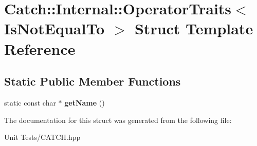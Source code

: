 \hypertarget{structCatch_1_1Internal_1_1OperatorTraits_3_01IsNotEqualTo_01_4}{}\section{Catch\+:\+:Internal\+:\+:Operator\+Traits$<$ Is\+Not\+Equal\+To $>$ Struct Template Reference}
\label{structCatch_1_1Internal_1_1OperatorTraits_3_01IsNotEqualTo_01_4}
\subsection*{Static Public Member Functions}
\begin{DoxyCompactItemize}
\item 
static const char $\ast$ {\bfseries get\+Name} ()\hypertarget{structCatch_1_1Internal_1_1OperatorTraits_3_01IsNotEqualTo_01_4_a54a795b8bf7c80a9fdbc7b81f39133b4}{}\label{structCatch_1_1Internal_1_1OperatorTraits_3_01IsNotEqualTo_01_4_a54a795b8bf7c80a9fdbc7b81f39133b4}

\end{DoxyCompactItemize}


The documentation for this struct was generated from the following file\+:\begin{DoxyCompactItemize}
\item 
Unit Tests/C\+A\+T\+C\+H.\+hpp\end{DoxyCompactItemize}
